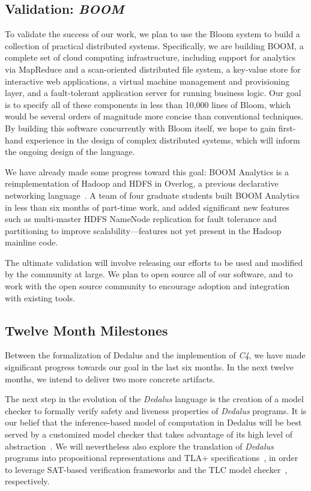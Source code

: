 \subsection{Validation: \emph{BOOM}}
To validate the success of our work, we plan to use the Bloom system
to build a collection of practical distributed systems. Specifically,
we are building BOOM, a complete set of cloud computing
infrastructure, including support for analytics via MapReduce and a
scan-oriented distributed file system, a key-value store for
interactive web applications, a virtual machine management and
provisioning layer, and a fault-tolerant application server for
running business logic. Our goal is to specify all of these components
in less than 10,000 lines of Bloom, which would be several orders of
magnitude more concise than conventional techniques. By building this
software concurrently with Bloom itself, we hope to gain first-hand
experience in the design of complex distributed systems, which will
inform the ongoing design of the language.

We have already made some progress toward this goal: BOOM Analytics is
a reimplementation of Hadoop and HDFS in Overlog, a previous
declarative networking language~\cite{boom-eurosys}. A team of four
graduate students built BOOM Analytics in less than six months of
part-time work, and added significant new features such as
multi-master HDFS NameNode replication for fault tolerance and
partitioning to improve scalability---features not yet present in the
Hadoop mainline code.


The ultimate validation will involve releasing our efforts to be used
and modified by the community at large. We plan to open source all of
our software, and to work with the open source community to encourage
adoption and integration with existing tools.

\subsection{Twelve Month Milestones}

Between the formalization of Dedalus and the implemention of  \emph{C4}, we have made significant progress towards
our goal in the last six months.  In the next twelve months, we intend to deliver two more concrete artifacts.

The next step in the evolution of the \emph{Dedalus} language is the creation of a model checker to formally verify safety and liveness
properties of \emph{Dedalus} programs.  It is our belief that the inference-based model of computation in Dedalus will
be best served by a customized model checker that takes advantage of its high level of abstraction~\cite{cardan, armc}.  
We will nevertheless also explore the
translation of \emph{Dedalus} programs into propositional representations and TLA+ specifications~\cite{tla}, in order to leverage SAT-based 
verification frameworks and the TLC model checker~\cite{tlc}, respectively.  


